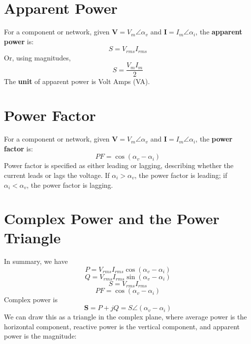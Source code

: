 \documentclass{article}
\begin{document}
\section{Apparent Power}
For a component or network, given $\bm{V} = V_m \angle \alpha_v$ and $\bm{I} = I_m \angle \alpha_i$, the \textbf{apparent power} is:
$$S = V_{rms}I_{rms}$$
Or, using magnitudes,
$$S = \frac{V_mI_m}{2}$$
The \textbf{unit} of apparent power is Volt Amps (VA).

\section{Power Factor}
For a component or network, given $\bm{V} = V_m \angle \alpha_v$ and $\bm{I} = I_m \angle \alpha_i$, the \textbf{power factor} is:
$$PF = \cos(\alpha_v - \alpha_i)$$
Power factor is specified as either leading or lagging, describing whether the current leads or lags the voltage. If $\alpha_i > \alpha_v$, the power factor is leading; if $\alpha_i < \alpha_v$, the power factor is lagging.

\section{Complex Power and the Power Triangle}
In summary, we have
$$P = V_{rms}I_{rms}\cos(\alpha_v - \alpha_i)$$
$$Q = V_{rms}I_{rms}\sin(\alpha_v - \alpha_i)$$
$$S = V_{rms}I_{rms}$$
$$PF = \cos(\alpha_v - \alpha_i)$$
Complex power is
$$\bm{S} = P + jQ = S \angle (\alpha_v - \alpha_i)$$
We can draw this as a triangle in the complex plane, where average power is the horizontal component, reactive power is the vertical component, and apparent power is the magnitude:
\begin{figure}[H]
\centering
{}
\end{figure}


\newpage
\end{document}
